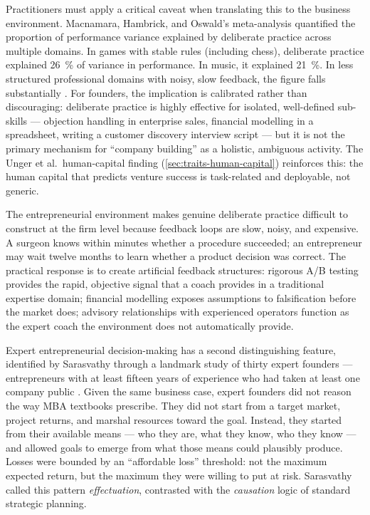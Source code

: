 Practitioners must apply a critical caveat when translating this to the business environment.
Macnamara, Hambrick, and Oswald's meta-analysis quantified the proportion of performance
variance explained by deliberate practice across multiple domains. %
In games with stable rules (including chess), deliberate practice explained \qty{26}{\percent}
of variance in performance. In music, it explained \qty{21}{\percent}. In less structured
professional domains with noisy, slow feedback, the figure falls substantially
\parencite{macnamara2014practice}. For founders, the implication is calibrated rather than
discouraging: deliberate practice is highly effective for isolated, well-defined sub-skills ---
objection handling in enterprise sales, financial modelling in a spreadsheet, writing a customer
discovery interview script --- but it is not the primary mechanism for ``company building'' as
a holistic, ambiguous activity. The Unger et al.\ human-capital finding (\cref{sec:traits-human-capital})
reinforces this: the human capital that predicts venture success is task-related and deployable,
not generic.

The entrepreneurial environment makes genuine deliberate practice difficult to construct at the
firm level because feedback loops are slow, noisy, and expensive. A surgeon knows within minutes
whether a procedure succeeded; an entrepreneur may wait twelve months to learn whether a product
decision was correct. The practical response is to create artificial feedback structures: rigorous
A/B testing provides the rapid, objective signal that a coach provides in a traditional expertise
domain; financial modelling exposes assumptions to falsification before the market does; advisory
relationships with experienced operators function as the expert coach the environment does not
automatically provide.

Expert entrepreneurial decision-making has a second distinguishing feature, identified by
Sarasvathy through a landmark study of thirty expert founders --- entrepreneurs with at least
fifteen years of experience who had taken at least one company public \parencite{sarasvathy2001causation}.
Given the same business case, expert founders did not reason the way MBA textbooks prescribe.
They did not start from a target market, project returns, and marshal resources toward the goal.
Instead, they started from their available means --- who they are, what they know, who they know
--- and allowed goals to emerge from what those means could plausibly produce. Losses were
bounded by an ``affordable loss'' threshold: not the maximum expected return, but the maximum
they were willing to put at risk. Sarasvathy called this pattern \emph{effectuation}, contrasted
with the \emph{causation} logic of standard strategic planning.

